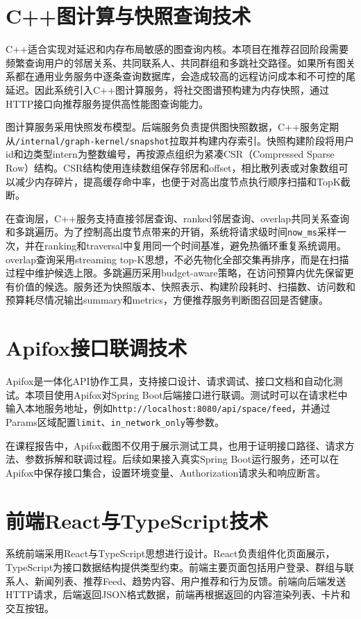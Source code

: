 \section{C++图计算与快照查询技术}

C++适合实现对延迟和内存布局敏感的图查询内核。本项目在推荐召回阶段需要频繁查询用户的邻居关系、共同联系人、共同群组和多跳社交路径。如果所有图关系都在通用业务服务中逐条查询数据库，会造成较高的远程访问成本和不可控的尾延迟。因此系统引入C++图计算服务，将社交图谱预构建为内存快照，通过HTTP接口向推荐服务提供高性能图查询能力。

图计算服务采用快照发布模型。后端服务负责提供图快照数据，C++服务定期从\texttt{/internal/graph-kernel/snapshot}拉取并构建内存索引。快照构建阶段将用户id和边类型intern为整数编号，再按源点组织为紧凑CSR（Compressed Sparse Row）结构。CSR结构使用连续数组保存邻居和offset，相比散列表或对象数组可以减少内存碎片，提高缓存命中率，也便于对高出度节点执行顺序扫描和TopK截断。

在查询层，C++服务支持直接邻居查询、ranked邻居查询、overlap共同关系查询和多跳遍历。为了控制高出度节点带来的开销，系统将请求级时间\texttt{now\_ms}采样一次，并在ranking和traversal中复用同一个时间基准，避免热循环重复系统调用。overlap查询采用streaming top-K思想，不必先物化全部交集再排序，而是在扫描过程中维护候选上限。多跳遍历采用budget-aware策略，在访问预算内优先保留更有价值的候选。服务还为快照版本、快照表示、构建阶段耗时、扫描数、访问数和预算耗尽情况输出summary和metrics，方便推荐服务判断图召回是否健康。

\section{Apifox接口联调技术}

Apifox是一体化API协作工具，支持接口设计、请求调试、接口文档和自动化测试。本项目使用Apifox对Spring Boot后端接口进行联调。测试时可以在请求栏中输入本地服务地址，例如\texttt{http://localhost:8080/api/space/feed}，并通过Params区域配置\texttt{limit}、\texttt{in\_network\_only}等参数。

在课程报告中，Apifox截图不仅用于展示测试工具，也用于证明接口路径、请求方法、参数拆解和联调过程。后续如果接入真实Spring Boot运行服务，还可以在Apifox中保存接口集合，设置环境变量、Authorization请求头和响应断言。

\section{前端React与TypeScript技术}

系统前端采用React与TypeScript思想进行设计。React负责组件化页面展示，TypeScript为接口数据结构提供类型约束。前端主要页面包括用户登录、群组与联系人、新闻列表、推荐Feed、趋势内容、用户推荐和行为反馈。前端向后端发送HTTP请求，后端返回JSON格式数据，前端再根据返回的内容渲染列表、卡片和交互按钮。

